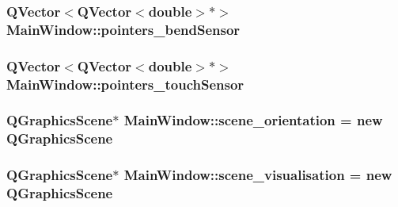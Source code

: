 \subsubsection[{\texorpdfstring{pointers\+\_\+bend\+Sensor}{pointers_bendSensor}}]{\setlength{\rightskip}{0pt plus 5cm}Q\+Vector$<$Q\+Vector$<$double$>$$\ast$$>$ Main\+Window\+::pointers\+\_\+bend\+Sensor\hspace{0.3cm}{\ttfamily [private]}}\hypertarget{class_main_window_adae442bba459aafe03b3761691e26b4b}{}\label{class_main_window_adae442bba459aafe03b3761691e26b4b}
\subsubsection[{\texorpdfstring{pointers\+\_\+touch\+Sensor}{pointers_touchSensor}}]{\setlength{\rightskip}{0pt plus 5cm}Q\+Vector$<$Q\+Vector$<$double$>$$\ast$$>$ Main\+Window\+::pointers\+\_\+touch\+Sensor\hspace{0.3cm}{\ttfamily [private]}}\hypertarget{class_main_window_a922235380595bb912d0856b548f15f7f}{}\label{class_main_window_a922235380595bb912d0856b548f15f7f}
\subsubsection[{\texorpdfstring{scene\+\_\+orientation}{scene_orientation}}]{\setlength{\rightskip}{0pt plus 5cm}Q\+Graphics\+Scene$\ast$ Main\+Window\+::scene\+\_\+orientation = new Q\+Graphics\+Scene\hspace{0.3cm}{\ttfamily [private]}}\hypertarget{class_main_window_ae0596a9c14d7ce17955bdc53aae33b96}{}\label{class_main_window_ae0596a9c14d7ce17955bdc53aae33b96}
\subsubsection[{\texorpdfstring{scene\+\_\+visualisation}{scene_visualisation}}]{\setlength{\rightskip}{0pt plus 5cm}Q\+Graphics\+Scene$\ast$ Main\+Window\+::scene\+\_\+visualisation = new Q\+Graphics\+Scene\hspace{0.3cm}{\ttfamily [private]}}\hypertarget{class_main_window_a9f7060038c5585a483d5b4f0b5f59a7c}{}\label{class_main_window_a9f7060038c5585a483d5b4f0b5f59a7c}
